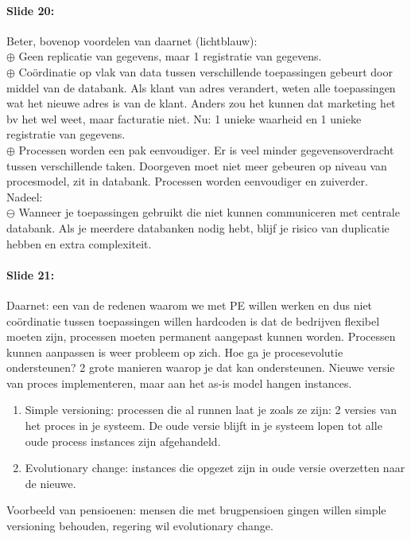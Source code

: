 \documentclass[10pt,a4paper]{report}
\begin{document}
\paragraph{Slide 20:}Beter, bovenop voordelen van daarnet (lichtblauw):\\
$\oplus$ Geen replicatie van gegevens, maar 1 registratie van gegevens.\\
$\oplus$ Coördinatie op vlak van data tussen verschillende toepassingen gebeurt door middel van de databank. Als klant van adres verandert, weten alle toepassingen wat het nieuwe adres is van de klant. Anders zou het kunnen dat marketing het bv het wel weet, maar facturatie niet. Nu: 1 unieke waarheid en 1 unieke registratie van gegevens.\\
$\oplus$ Processen worden een pak eenvoudiger. Er is veel minder gegevensoverdracht tussen verschillende taken. Doorgeven moet niet meer gebeuren op niveau van procesmodel, zit in databank. Processen worden eenvoudiger en zuiverder.\\
Nadeel:\\
$\ominus$ Wanneer je toepassingen gebruikt die niet kunnen communiceren met centrale databank. Als je meerdere databanken nodig hebt, blijf je risico van duplicatie hebben en extra complexiteit.

\paragraph{Slide 21:}Daarnet: een van de redenen waarom we met PE willen werken en dus niet coördinatie tussen toepassingen willen hardcoden is dat de bedrijven flexibel moeten zijn, processen moeten permanent aangepast kunnen worden. Processen kunnen aanpassen is weer probleem op zich. Hoe ga je procesevolutie ondersteunen? 2 grote manieren waarop je dat kan ondersteunen.
Nieuwe versie van proces implementeren, maar aan het as-is model hangen instances.
\begin{enumerate}
\item Simple versioning: processen die al runnen laat je zoals ze zijn: 2 versies van het proces in je systeem. De oude versie blijft in je systeem lopen tot alle oude process instances zijn afgehandeld.
\item Evolutionary change: instances die opgezet zijn in oude versie overzetten naar de nieuwe.
\end{enumerate}
Voorbeeld van pensioenen: mensen die met brugpensioen gingen willen simple versioning behouden, regering wil evolutionary change.
\end{document}
